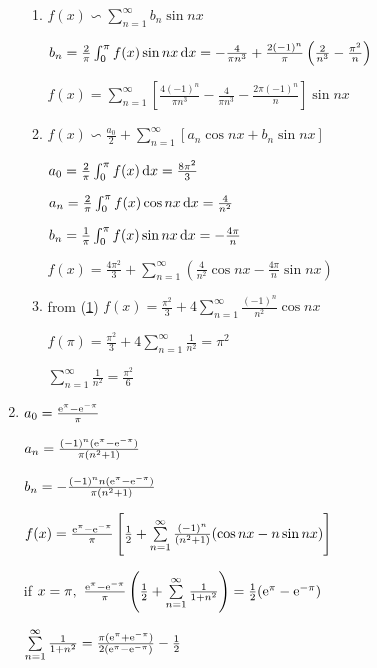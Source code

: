 \begin{enumerate}[1]
\begin{enumerate}[(1)]
        \item 
        \par $f(x)\backsim \sum \limits_{n=1}^{\infty}b_n\sin nx$
        \par $b_n=\frac{2}{\pi}\int_0^{\pi}f(x)\sin nx\dif x= - \frac{4}{\pi n^3} + \frac{2(-1)^n}{\pi}\left(\frac{2}{n^3} - \frac{\pi^2}{n}\right)$
        \par $f(x) = \sum \limits_{n=1}^{\infty}\left[\frac{4(-1)^n}{\pi n^3}- \frac{4}{\pi n^3} - \frac{2\pi(-1)^n}{n}  \right]\sin nx$

        \item 
        \par $ f(x)\backsim\frac{a_0}{2}+\sum \limits_{n=1}^{\infty}[a_n\cos nx+b_n\sin nx]$
        \par $a_0=\frac{2}{\pi}\int_0^{\pi}f(x)\dif x=\frac{8\pi^2}{3}$
        \par $a_n=\frac{2}{\pi}\int_0^{\pi}f(x)\cos nx\dif x=\frac{4}{n^2}$
        \par $b_n=\frac{1}{\pi}\int_0^{\pi}f(x)\sin nx\dif x= -\frac{4\pi}{n}$
        \par $f(x) = \frac{4\pi^2}{3} + \sum \limits_{n=1}^{\infty} \left(\frac{4}{n^2} \cos nx -\frac{4\pi}{n} \sin nx\right)$


        \item 
        from (\hyperref[(1)]{1}) $f(x) =  \frac{\pi^2}{3} + 4\sum \limits_{n=1}^{\infty} \frac{(-1)^n}{n^2} \cos nx$
        \par $f(\pi) =  \frac{\pi^2}{3} + 4\sum \limits_{n=1}^{\infty} \frac{1}{n^2} = \pi^2$
        \par $\sum \limits_{n=1}^{\infty} \frac{1}{n^2} = \frac{\pi^2}{6}$
    \end{enumerate}
    

    \item 
    \par $a_0=\frac{\mathrm{e}^{\pi}-\mathrm{e}^{-\pi}}{\pi}$
    \par $a_n=\frac{(-1)^n(\mathrm{e}^{\pi}-\mathrm{e}^{-\pi})}{\pi(n^2+1)}$
    \par $b_n=-\frac{(-1)^nn(\mathrm{e}^{\pi}-\mathrm{e}^{-\pi})}{\pi(n^2+1)}$
    \par $f(x) = \frac{\mathrm{e}^{\pi}-\mathrm{e}^{-\pi}}{\pi}\left[\frac{1}{2}+\sum \limits_{n=1}^{\infty} \frac{(-1)^n}{(n^2+1)} (\cos nx - n \sin nx)\right]$
    \par if $x=\pi,\ \frac{\mathrm{e}^\pi - \mathrm{e}^{-\pi}}{\pi}\left(\frac{1}{2}+\sum \limits_{n=1}^{\infty} \frac{1}{1+n^2} \right)=\frac{1}{2}(\mathrm{e}^\pi - \mathrm{e}^{-\pi})$
    \par $\sum \limits_{n=1}^{\infty}\frac{1}{1+n^2}=\frac{\pi(\mathrm{e}^{\pi}+\mathrm{e}^{-\pi})}{2(\mathrm{e}^{\pi}-\mathrm{e}^{-\pi})}-\frac{1}{2}$


\end{enumerate}
